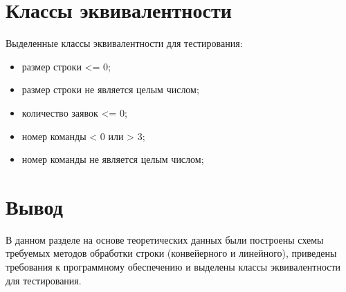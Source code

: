 \section{Классы эквивалентности}

Выделенные классы эквивалентности для тестирования:

\begin{itemize}[label=---]
	\item размер строки <= 0;
	\item размер строки не является целым числом;
	\item количество заявок <= 0;
	\item номер команды < 0 или > 3;
	\item номер команды не является целым числом;
\end{itemize}



\section*{Вывод}

В данном разделе на основе теоретических данных были построены схемы требуемых методов обработки строки (конвейерного и линейного), приведены требования к программному обеспечению и выделены классы эквивалентности для тестирования.

\clearpage